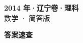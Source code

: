 \documentclass[zihao=-4, a4paper]{ctexart}
\begin{document}
\begin{center}
  {\Large\bfseries 2014 年·辽宁卷·理科}\\[4pt]
  {\large 数学 · 简答版}
\end{center}
\medskip
{}

\clearpage
{}
\begin{center}{\Large\bfseries 答案速查}\end{center}
\medskip

\end{document}
